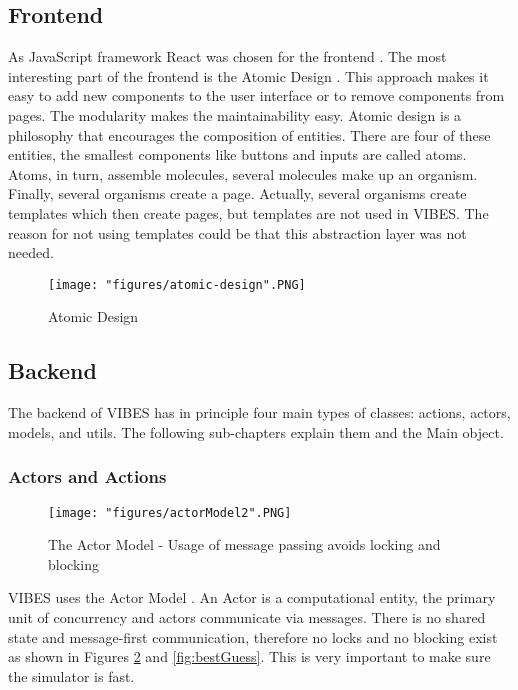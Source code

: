 \subsection{Frontend}
As JavaScript framework React was chosen for the frontend \cite{react}. The most interesting part of the frontend is the Atomic Design \cite{atomicdesign}. This approach makes it easy to add new components to the user interface or to remove components from pages. The modularity makes the maintainability easy. Atomic design is a philosophy that encourages the composition of entities. There are four of these entities, the smallest components like buttons and inputs are called atoms. Atoms, in turn, assemble molecules, several molecules make up an organism. Finally, several organisms create a page. Actually, several organisms create templates which then create pages, but templates are not used in VIBES. The reason for not using templates could be that this abstraction layer was not needed.

\begin{figure}[!htb]
\centering
\texttt{[image: "figures/atomic-design".PNG]}
\caption{Atomic Design \cite{atomicdesign}
\label{fig:atomicDesign}}
\end{figure}

\subsection{Backend}
The backend of VIBES has in principle four main types of classes: actions, actors, models, and utils. The following sub-chapters explain them and the Main object.

\subsubsection{Actors and Actions}
\begin{figure}[!htb]
\centering
\texttt{[image: "figures/actorModel2".PNG]}
\caption{The Actor Model - Usage of message passing avoids locking and blocking
\label{fig:actorModel}}
\end{figure}

VIBES uses the Actor Model \cite{Hewitt:1973:UMA:1624775.1624804}. An Actor is a computational entity, the primary unit of concurrency and actors communicate via messages. There is no shared state and message-first communication, therefore no locks and no blocking exist as shown in Figures \ref{fig:actorModel} and \ref{fig:bestGuess}. This is very important to make sure the simulator is fast.

